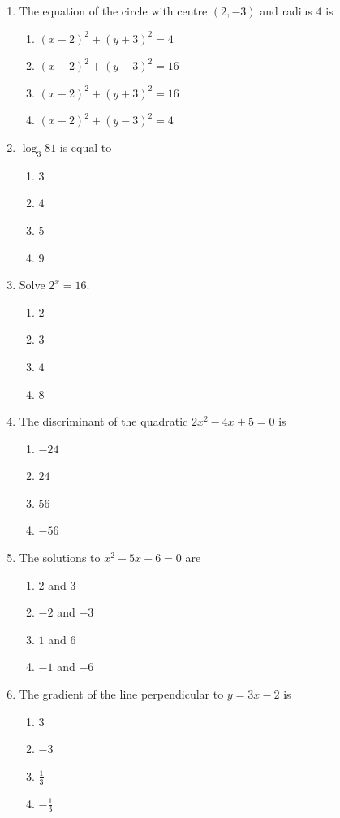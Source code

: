 \documentclass{../Templates/sbs-exam}
\begin{document}
\begin{enumerate}
    \item The equation of the circle with centre $(2,-3)$ and radius $4$ is
    \begin{enumerate}
        \item $(x-2)^2 + (y+3)^2 = 4$
        \item $(x+2)^2 + (y-3)^2 = 16$
        \item $(x-2)^2 + (y+3)^2 = 16$
        \item $(x+2)^2 + (y-3)^2 = 4$
    \end{enumerate}
    
    \item $\log_3 81$ is equal to
    \begin{enumerate}
        \item $3$
        \item $4$
        \item $5$
        \item $9$
    \end{enumerate}
    
    \item Solve $2^{x} = 16$.
    \begin{enumerate}
        \item $2$
        \item $3$
        \item $4$
        \item $8$
    \end{enumerate}
    
    \item The discriminant of the quadratic $2x^2 - 4x + 5 = 0$ is
    \begin{enumerate}
        \item $-24$
        \item $24$
        \item $56$
        \item $-56$
    \end{enumerate}
    
    \item The solutions to $x^2 - 5x + 6 = 0$ are
    \begin{enumerate}
        \item $2$ and $3$
        \item $-2$ and $-3$
        \item $1$ and $6$
        \item $-1$ and $-6$
    \end{enumerate}
    
    \item The gradient of the line perpendicular to $y = 3x - 2$ is
    \begin{enumerate}
        \item $3$
        \item $-3$
        \item $\frac{1}{3}$
        \item $-\frac{1}{3}$
    \end{enumerate}
\end{enumerate}
\end{document}
